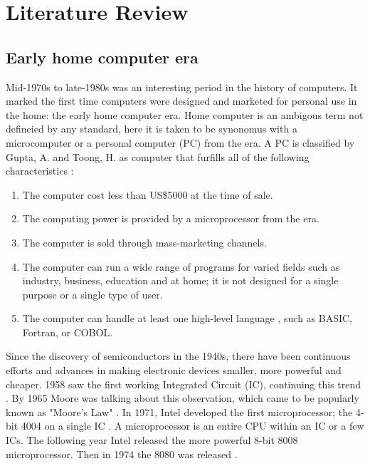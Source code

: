 

\chapter{Literature Review} %
\label{Chapter2} %

\section{Early home computer era}
 
Mid-1970s to late-1980s was an interesting period in the history of computers. It marked the first time computers were designed and marketed for personal use in the home: the early home computer era. Home computer is an ambigous term not defineied by any standard, here it is taken to be synonomus with a microcomputer or a personal computer (PC) from the era.  A PC is classified by Gupta, A. and Toong, H.  as computer that furfills all of the following characteristics \cite{Gupta84}: \\

\begin{enumerate}
\item The computer cost less than US\$5000 at the time of sale.\\
\item The computing power is provided by a microprocessor from the era. \\
\item The computer is sold through mass-marketing channels. \\
\item The computer can run a wide range of programs for varied fields such as industry, business, education and at home; it is not designed for a single purpose or a single type of user.
\item The computer can handle at least one high-level language , such as BASIC, Fortran, or COBOL.
\end{enumerate}

Since the discovery of semiconductors in the 1940s, there have been continuous efforts and advances in making electronic devices smaller, more powerful and cheaper. 1958 saw the first working Integrated Circuit (IC), continuing this trend \cite{Kilby01}. By 1965 Moore was talking about this observation, which came to be popularly known as "Moore's Law" \cite{moore65}. In 1971, Intel developed the first microprocessor; the 4-bit 4004 on a single IC \cite{intel4004}. A microprocessor is an entire CPU within an IC or a few ICs. The following year Intel released the more powerful 8-bit 8008 microprocessor. Then in 1974 the 8080 was released \cite{intelchips}. \\

